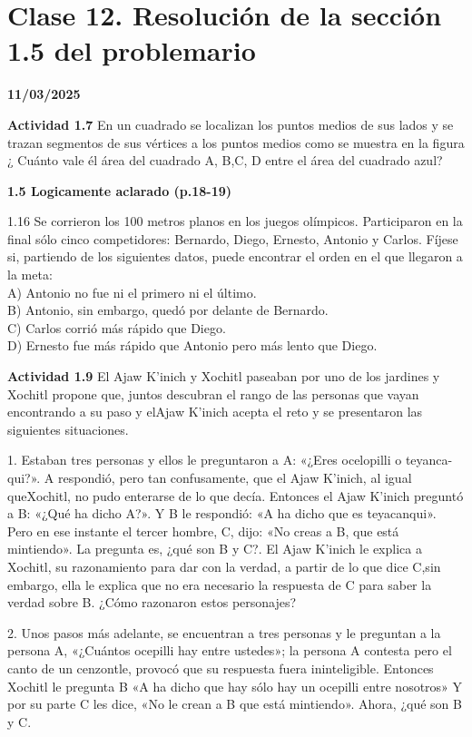 \section{Clase 12. Resolución de la sección 1.5 del problemario}
\textbf{11/03/2025}

\textbf{Actividad 1.7}
En un cuadrado se localizan los puntos medios de sus lados y se trazan segmentos de sus vértices a los puntos medios como se muestra en la figura
¿ Cuánto vale él área del cuadrado A, B,C, D entre el área
del cuadrado azul?

\textbf{1.5 Logicamente aclarado (p.18-19)}
\begin{excercise}
1.16 Se corrieron los 100 metros planos en los juegos olímpicos. Participaron en la final sólo cinco competidores: Bernardo, Diego, Ernesto, Antonio y Carlos. Fíjese si, partiendo de los siguientes datos, puede encontrar el orden en el que llegaron a la meta:
\\ A) Antonio no fue ni el primero ni el último.
\\ B) Antonio, sin embargo, quedó por delante de Bernardo.
\\ C) Carlos corrió más rápido que Diego.
\\ D) Ernesto fue más rápido que Antonio pero más lento que Diego.
\end{excercise}

\textbf{Actividad 1.9}
El Ajaw K’inich y Xochitl paseaban por uno de los jardines y Xochitl propone
que, juntos descubran el rango de las personas que vayan encontrando a su paso y elAjaw K’inich acepta el reto y se presentaron las siguientes situaciones.

1. Estaban tres personas y ellos le preguntaron a A: «¿Eres ocelopilli o teyanca-qui?». A respondió, pero tan confusamente, que el Ajaw K’inich, al igual queXochitl, no pudo enterarse de lo que decía. Entonces el Ajaw K’inich preguntó a B: «¿Qué ha dicho A?». Y B le respondió: «A ha dicho que es teyacanqui». Pero en ese instante el tercer hombre, C, dijo: «No creas a B, que está mintiendo». La pregunta es, ¿qué son B y C?. El Ajaw K’inich le explica a Xochitl, su razonamiento para dar con la verdad, a partir de lo que dice C,sin embargo, ella le explica que no era necesario la respuesta de C para saber la verdad sobre B. ¿Cómo razonaron estos personajes?

2. Unos pasos más adelante, se encuentran a tres personas y le preguntan a la persona A, «¿Cuántos ocepilli hay entre ustedes»; la persona A contesta pero el canto de un cenzontle, provocó que su respuesta fuera ininteligible. Entonces Xochitl le pregunta B «A ha dicho que hay sólo hay un ocepilli entre nosotros» Y por su parte C les dice, «No le crean a B que está mintiendo». Ahora, ¿qué son B y C.

